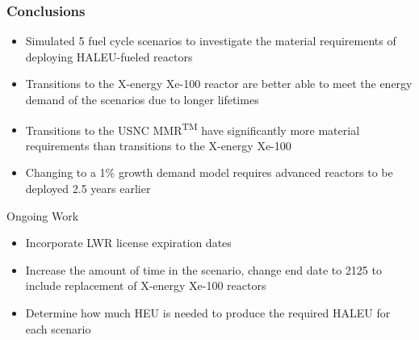 \begin{frame}
    \frametitle{Conclusions}
    \begin{itemize}
        \item Simulated 5 fuel cycle scenarios to investigate the material 
              requirements of deploying \gls{HALEU}-fueled reactors
        \item Transitions to the X-energy Xe-100 reactor are better able to meet 
              the energy demand of the scenarios due to longer lifetimes
        \item Transitions to the \gls{USNC} \gls{MMR}\textsuperscript{TM}
              have significantly more material requirements than transitions to 
              the X-energy Xe-100
        \item Changing to a 1\% growth demand model requires 
              advanced reactors to be deployed 2.5 years earlier
    \end{itemize}
    \begin{block}{Ongoing Work}
        \begin{itemize}
            \item Incorporate \gls{LWR} license expiration dates
            \item Increase the amount of time in the scenario, change end date to 2125 to include 
                  replacement of X-energy Xe-100 reactors
            \item Determine how much \gls{HEU} is needed to produce the required \gls{HALEU} for 
                  each scenario
        \end{itemize}
    \end{block}
\end{frame}
